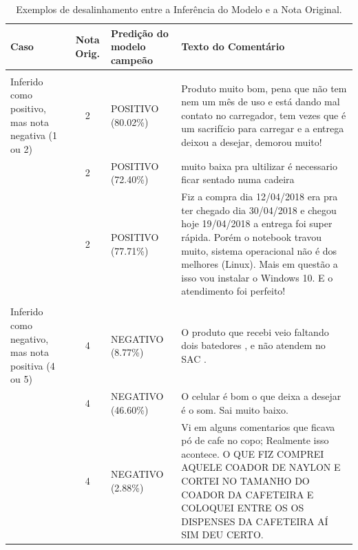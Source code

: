\documentclass{IEEEtran}
\begin{document}
\begin{table}[htpb]
    \centering
    \caption{Exemplos de desalinhamento entre a Inferência do Modelo e a Nota Original.}
    \label{tab:desalinhamento_inferencia_nota}
    \renewcommand{\arraystretch}{1.4}
    \begin{tabular}{>{\raggedright\arraybackslash}p{3.5cm} c >{\raggedright\arraybackslash}p{2.5cm} p{7.5cm}}
        \toprule
        \textbf{Caso} & \textbf{Nota Orig.} & \textbf{Predição do modelo campeão} & \textbf{Texto do Comentário} \\
        \midrule
        \multirow{8}{=}{\textbf{2a} \\ Inferido como positivo, mas nota negativa (1 ou 2)} 
        & 2 & POSITIVO \newline (80.02\%) & Produto muito bom, pena que não tem nem um mês de uso e está dando mal contato no carregador, tem vezes que é um sacrifício para carregar e a entrega deixou a desejar, demorou muito! \\
        \cmidrule{2-4}
        & 2 & POSITIVO \newline (72.40\%) & muito baixa pra ultilizar é necessario ficar sentado numa cadeira \\
        \cmidrule{2-4}
        & 2 & POSITIVO \newline (77.71\%) & Fiz a compra dia 12/04/2018 era pra ter chegado dia 30/04/2018 e chegou hoje 19/04/2018 a entrega foi super rápida. Porém o notebook travou muito, sistema operacional não é dos melhores (Linux). Mais em questão a isso vou instalar o Windows 10. E o atendimento foi perfeito! \\
        \midrule
        \multirow{6}{=}{\textbf{2b} \\ Inferido como negativo, mas nota positiva (4 ou 5)} 
        & 4 & NEGATIVO \newline (8.77\%) & O produto que recebi veio faltando dois batedores , e não atendem no SAC . \\
        \cmidrule{2-4}
        & 4 & NEGATIVO \newline (46.60\%) & O celular é bom o que deixa a desejar é o som. Sai muito baixo. \\
        \cmidrule{2-4}
        & 4 & NEGATIVO \newline (2.88\%) & Vi em alguns comentarios que ficava pó de cafe no copo; Realmente isso acontece. O QUE FIZ COMPREI AQUELE COADOR DE NAYLON E CORTEI NO TAMANHO DO COADOR DA CAFETEIRA E COLOQUEI ENTRE OS OS DISPENSES DA CAFETEIRA AÍ SIM DEU CERTO. \\
        \bottomrule
    \end{tabular}
\end{table}
\end{document}
